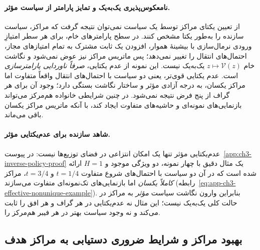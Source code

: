 \paragraph{نامعکوس‌پذیری یک‌به‌یک و تمایز پارامتر از سیاست مؤثر.}
از تعیین یکتای مراکز توسط
یک سیاست نمی‌توان نتیجه گرفت
که مراکز، سیاست سازنده را
به‌طور یکتا مشخص کنند.
در سطح پارامترهای خام،
برای هر سطر امتیازِ ورودی نرمال‌سازی با بیشینهٔ هموار،
افزودن یک ثابت مشترک به
تمام امتیازهای مجاز،
احتمال‌های انتقال را
تغییر نمی‌دهد؛ پس
ماتریس مراکز نیز عوض
نمی‌شود و نگاشت خام
$z\mapsto\mathcal V(z)$
یک‌به‌یک نیست.
این نمونه از عدم یکتایی،
\emph{صرفاً ناوردایی
پارامترسازی} است.
عدم یکتایی قوی‌تر،
یعنی دو سیاست با
احتمال‌های انتقال
واقعاً متفاوت اما
مراکز یکسان، به
درجه آزادی مؤثر و
ساختار نگاشت بستگی دارد؛
وجود آن برای هر گراف
از پنج فرض نتیجه نمی‌شود.
در چنین شرایطی
خانواده هم‌مرکز می‌تواند
بازنمایی‌های نمونه‌ای
و حاشیه‌های متفاوت
ایجاد کند، با آنکه
ماتریس مراکز یکسان
باقی می‌ماند.


\paragraph{شاهد سازنده برای عدم‌یکتایی مؤثر.}
عدم‌یکتایی مؤثر تنها یک امکان انتزاعی در فضای توزیع‌ها نیست:
در پیوست~\ref{app:ch3-inverse-policy-proof} یک مثال دقیق با
چهار نمونه، دو ویژگی موجود و $H=1$ ارائه شده است که در آن
دو سیاست  با احتمال‌های شروع متفاوت
$t=1/4$ و $t=3/4$، مراکز \emph{کاملاً یکسان}
اما بازنمایی‌های تک‌نمونه‌ای متفاوت می‌سازند
(رابطه~\eqref{eq:app-ch3-effective-nonunique-example}).
بنابراین وارون نگاشت سیاست \emph{مؤثر} به مراکز
در حالت کلی یک‌به‌یک نیست؛ این مثال نه عدم‌یکتایی
در هر گراف و هر افق را ثابت می‌کند و نه وجود سیاست بهتر
در هر فیبر هم‌مرکز را.



\subsection{بهبود مراکز و شرایط ضروری دستیابی به مراکز هدف}

